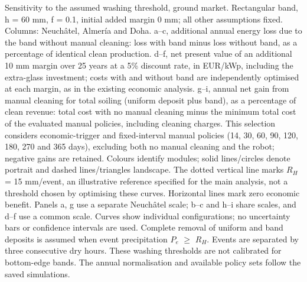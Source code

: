 Sensitivity to the assumed washing threshold, ground market. Rectangular band, h = 60 mm, f = 0.1, initial added margin 0 mm; all other assumptions fixed. Columns: Neuchâtel, Almería and Doha. a–c, additional annual energy loss due to the band without manual cleaning: loss with band minus loss without band, as a percentage of identical clean production. d–f, net present value of an additional 10 mm margin over 25 years at a 5\% discount rate, in EUR/kWp, including the extra-glass investment; costs with and without band are independently optimised at each margin, as in the existing economic analysis. g–i, annual net gain from manual cleaning for total soiling (uniform deposit plus band), as a percentage of clean revenue: total cost with no manual cleaning minus the minimum total cost of the evaluated manual policies, including cleaning charges. This selection considers economic-trigger and fixed-interval manual policies (14, 30, 60, 90, 120, 180, 270 and 365 days), excluding both no manual cleaning and the robot; negative gains are retained. Colours identify modules; solid lines/circles denote portrait and dashed lines/triangles landscape. The dotted vertical line marks $R_H$ = 15 mm/event, an illustrative reference specified for the main analysis, not a threshold chosen by optimising these curves. Horizontal lines mark zero economic benefit. Panels a, g use a separate Neuchâtel scale; b–c and h–i share scales, and d–f use a common scale. Curves show individual configurations; no uncertainty bars or confidence intervals are used. Complete removal of uniform and band deposits is assumed when event precipitation $P_e$ $\geq$ $R_H$. Events are separated by three consecutive dry hours. These washing thresholds are not calibrated for bottom-edge bands. The annual normalisation and available policy sets follow the saved simulations.
